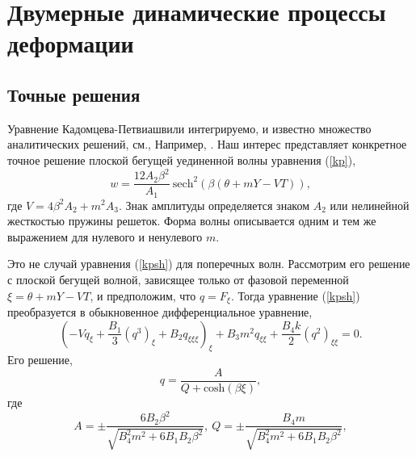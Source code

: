 \section{Двумерные динамические процессы деформации}

\subsection{Точные решения}

Уравнение Кадомцева-Петвиашвили интегрируемо, и известно множество аналитических решений, см., Например, \cite{Ablowitz}. Наш интерес представляет конкретное точное решение плоской бегущей уединенной волны уравнения (\ref {kp}),
\begin{equation}
	w=\frac{12A_2 \beta^2}{A_1}~{\text{sech}}^2\left(\beta( \theta+m Y - V T)\right), \label{solkp}
\end{equation}
где $V=4\beta^2 A_2+m^2 A_3 $. 
Знак амплитуды определяется знаком $A_2$ или нелинейной жесткостью пружины решеток. Форма волны описывается одним и тем же выражением для нулевого и ненулевого $m$.

Это не случай уравнения (\ref{kpsh}) для поперечных волн. Рассмотрим его решение с плоской бегущей волной, зависящее только от фазовой переменной $\xi = \theta + m Y - V T$, и предположим, что $ q = F_\xi $. Тогда уравнение (\ref {kpsh}) преобразуется в обыкновенное дифференциальное уравнение,
\[
(-V q_\xi+\frac{B_1}{3} (q^3)_\xi+B_2 q_{\xi\xi\xi})_\xi+B_3m^2  q_{\xi\xi} +\frac{B_4 k}{2} (q^2)_{\xi\xi}=0.
\]
Его решение,
\begin{equation}
	q=\frac{A}{Q+{\text{cosh}( \beta \xi)}},\label{solshear}
\end{equation}
где
\[
	A=\pm \frac{6B_2 \beta^2}{\sqrt{B_4^2 m^2+6 B_1 B_2 \beta^2}}, 
	~Q=\pm\frac{B_4 m }{\sqrt{B_4^2 m^2+6 B_1 B_2 \beta^2}},
\]

